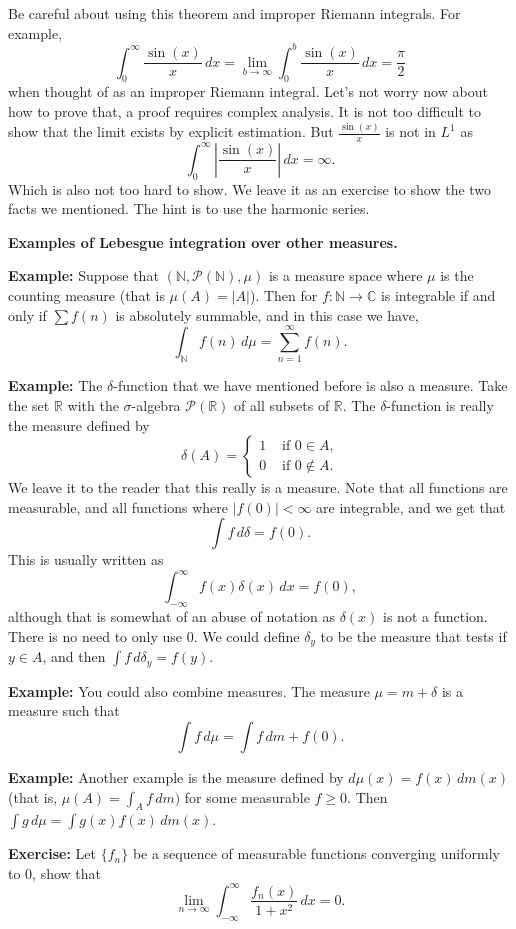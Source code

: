 \documentclass[12pt]{book}
\newcommand{\abs}[1]{\left\lvert {#1} \right\rvert}
\newcommand{\C}{{\mathbb{C}}}
\newcommand{\R}{{\mathbb{R}}}
\newcommand{\N}{{\mathbb{N}}}
\newcommand{\sP}{{\mathcal{P}}}
\theoremstyle{plain}
\theoremstyle{remark}
\theoremstyle{definition}
\theoremstyle{exercise}
\theoremstyle{example}
\begin{document}
\medskip

Be careful about using this theorem and improper Riemann integrals.  For
example,
$$
\int_{0}^\infty \frac{\sin(x)}{x} \, dx
= \lim_{b\to\infty}\int_{0}^b \frac{\sin(x)}{x} \, dx
= \frac{\pi}{2} 
$$
when thought of as an improper Riemann integral.  Let's not worry now about
how to prove that, a proof requires complex analysis.  It is not too
difficult to show that the limit exists by explicit estimation.  But 
$\frac{\sin(x)}{x}$ is not in $L^1$ as
$$
\int_{0}^\infty \abs{\frac{\sin(x)}{x}} \, dx = \infty.
$$
Which is also not too hard to show.  We leave it as an exercise to show the
two facts we mentioned.  The hint is to use the harmonic series.

\medskip

\textbf{Examples of Lebesgue integration over other measures.}
\nopagebreak

\medskip

\textbf{Example:}
Suppose that $(\N,\sP(\N),\mu)$ is a measure space where $\mu$
is the counting measure (that is $\mu(A) = \abs{A}$).  Then
for $f \colon \N \to \C$ is integrable if and only if
$\sum f(n)$ is absolutely summable, and in this case we have,
$$
\int_{\N} f(n) \, d\mu =
\sum_{n=1}^\infty f(n) .
$$

\medskip

\textbf{Example:}
The $\delta$-function that we have mentioned before is also a measure.
Take the set $\R$ with the $\sigma$-algebra $\sP(\R)$ of all
subsets of $\R$.
The $\delta$-function is really the measure
defined by
$$
\delta(A) =
\begin{cases}
1 & \text{ if $0 \in A$,} \\
0 & \text{ if $0 \notin A$.}
\end{cases} 
$$
We leave it to the reader that this really is a measure.  Note that
all functions are measurable, and all functions where $\abs{f(0)} < \infty$
are integrable, and we get that
$$
\int f\, d\delta = f(0) .
$$
This is usually written as
$$
\int_{-\infty}^\infty f(x) \delta(x) \, dx = f(0) ,
$$
although that is somewhat of an abuse of notation as $\delta(x)$
is not a function.
There is no need to only use $0$.  We could define $\delta_y$ to be the
measure that tests if $y \in A$, and then
$\int f \, d\delta_y = f(y)$.

\medskip

\textbf{Example:}
You could also combine measures.  The measure $\mu = m + \delta$
is a measure such that
$$
\int f \, d\mu = \int f \, dm + f(0) .
$$

\medskip

\textbf{Example:}
Another example is the measure defined by $d\mu(x) = f(x)\,dm(x)$ (that is,
$\mu(A) = \int_A f \, dm)$ for some measurable $f \geq 0$.  Then $\int g \,
d\mu = \int g(x) f(x) \, dm(x)$.

\medskip

\textbf{Exercise:}
Let $\{ f_n \}$ be a sequence of measurable functions converging uniformly to 0, show
that
$$
\lim_{n\to \infty} \int_{-\infty}^\infty \frac{f_n(x)}{1+x^2} \, dx = 0.
$$
\end{document}
